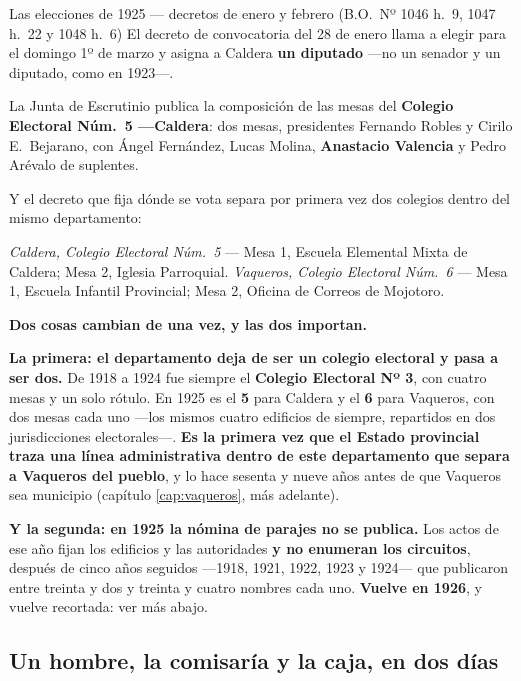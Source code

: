 \begin{ficha}{Las elecciones de 1925 --- decretos de enero y febrero (B.O.\ Nº 1046 h.\ 9, 1047 h.\ 22 y 1048 h.\ 6)}
El decreto de convocatoria del 28 de enero llama a elegir para el domingo 1º de marzo y asigna a
Caldera \textbf{un diputado} ---no un senador y un diputado, como en 1923---.

La Junta de Escrutinio publica la composición de las mesas del \textbf{Colegio Electoral
Núm.\ 5 ---Caldera}: dos mesas, presidentes Fernando Robles y Cirilo E.\ Bejarano, con
Ángel Fernández, Lucas Molina, \textbf{Anastacio Valencia} y Pedro Arévalo de suplentes.

Y el decreto que fija dónde se vota separa por primera vez dos colegios dentro del mismo
departamento:

\textit{Caldera, Colegio Electoral Núm.\ 5} --- Mesa 1, Escuela Elemental Mixta de Caldera;
Mesa 2, Iglesia Parroquial.
\textit{Vaqueros, Colegio Electoral Núm.\ 6} --- Mesa 1, Escuela Infantil Provincial; Mesa 2,
Oficina de Correos de Mojotoro.
\end{ficha}

\begin{cautela}
\textbf{Dos cosas cambian de una vez, y las dos importan.}

\textbf{La primera: el departamento deja de ser un colegio electoral y pasa a ser dos.} De 1918 a
1924 fue siempre el \textbf{Colegio Electoral Nº 3}, con cuatro mesas y un solo rótulo. En 1925
es el \textbf{5} para Caldera y el \textbf{6} para Vaqueros, con dos mesas cada uno ---los mismos
cuatro edificios de siempre, repartidos en dos jurisdicciones electorales---. \textbf{Es la
primera vez que el Estado provincial traza una línea administrativa dentro de este departamento
que separa a Vaqueros del pueblo}, y lo hace sesenta y nueve años antes de que Vaqueros sea
municipio (capítulo \ref{cap:vaqueros}, más adelante).

\textbf{Y la segunda: en 1925 la nómina de parajes no se publica.} Los actos de ese año fijan los
edificios y las autoridades \textbf{y no enumeran los circuitos}, después de cinco años seguidos
---1918, 1921, 1922, 1923 y 1924--- que publicaron entre treinta y dos y treinta y cuatro nombres
cada uno. \textbf{Vuelve en 1926}, y vuelve recortada: ver más abajo.
\end{cautela}

\subsection*{Un hombre, la comisaría y la caja, en dos días}

